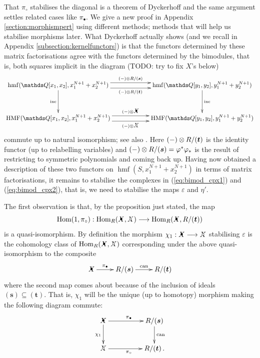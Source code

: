 \documentclass{compositio}
\theoremstyle{definition}
\numberwithin{equation}{section}
\def\inc{\operatorname{inc}}
\def\can{\operatorname{can}}
\def\Hom{\operatorname{Hom}}
\DeclareMathOperator{\hmf}{hmf}
\DeclareMathOperator{\HMF}{HMF}
\begin{document}
That $\pi_{\circ}$ stabilises the diagonal is a theorem of Dyckerhoff \cite{d0904.4713} and the same argument settles related cases like $\pi_{\bullet}$. We give a new proof in  Appendix \ref{section:morphismpert} using different methods; methods that will help us stabilise morphisms later. What Dyckerhoff actually shows (and we recall in Appendix \ref{subsection:kernelfunctors}) is that the functors determined by these matrix factorisations agree with the functors determined by the bimodules, that is, both squares implicit in the diagram (TODO: try to fix $X$'s below)
\[
\xymatrix@C+3pc@R+1pc{
\hmf(\QQ[x_1,x_2], x_1^{N+1} + x_2^{N+1})\ar[d]_-{\inc}\ar@<1ex>[r]^-{(-) \otimes R/(\bs{s})}
\ar@<-1ex>[r]_-{(-) \otimes R/(\bs{t})}
& \hmf(\QQ[y_1,y_2], y_1^{N+1} + y_2^{N+1})\ar[d]^-{\inc}\\
\HMF(\QQ[x_1,x_2], x_1^{N+1} + x_2^{N+1})\ar@<1ex>[r]^-{(-) \otimes \Xbul}
\ar@<-1ex>[r]_-{(-) \otimes \Xcirc}
& \HMF(\QQ[y_1,y_2], y_1^{N+1} + y_2^{N+1})
}
\]
commute up to natural isomorphism; see also \cite{b1105.0702}. Here $(-) \otimes R/(\boldsymbol{t})$ is the identity functor (up to relabelling variables) and $(-) \otimes R/(\boldsymbol{s}) = \varphi^* \varphi_*$ is the result of restricting to symmetric polynomials and coming back up. Having now obtained a description of these two functors on $\hmf(S, x_1^{N+1} + x_2^{N+1})$ in terms of matrix factorisations, it remains to stabilise the complexes in (\ref{eq:bimod_cpx1}) and (\ref{eq:bimod_cpx2}), that is, we need to stabilise the maps $\varepsilon$ and $\eta'$. 

The first observation is that, by the proposition just stated, the map
\[
\Hom(1,\pi_{\circ}): \Hom_R(\Xbul, \Xcirc) \lto \Hom_R(\Xbul, R/(\boldsymbol{t}))
\]
is a quasi-isomorphism. By definition the morphism $\chi_1: \Xbul \lto \Xcirc$ stabilising $\varepsilon$ is the cohomology class of $\Hom_R(\Xbul, \Xcirc)$ corresponding under the above quasi-isomorphism to the composite
\begin{equation}\label{eq:cons4}
\xymatrix{
\Xbul \ar[r]^-{\pi_{\bullet}} & R/(\boldsymbol{s}) \ar[r]^-{\can} & R/(\boldsymbol{t})
}
\end{equation}
where the second map comes about because of the inclusion of ideals $(\boldsymbol{s}) \subseteq (\boldsymbol{t})$. That is, $\chi_1$ will be the unique (up to homotopy) morphism making the following diagram commute:
\begin{equation}\label{eq:cons5}
\xymatrix@C+2pc{
\Xbul \ar[d]_{\chi_1} \ar[r]^{\pi_{\bullet}} & R/(\boldsymbol{s}) \ar[d]^{\can}\\
\Xcirc \ar[r]_{\pi_{\circ}} & R/(\boldsymbol{t}) \, . 
}
\end{equation}
\end{document}
